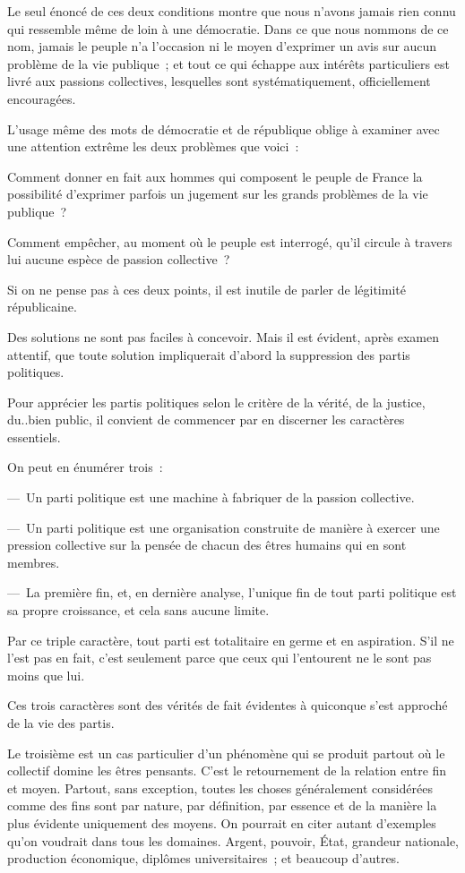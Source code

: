 \documentclass[french,twoside]{book} %
\begin{document}
Le seul énoncé de ces deux conditions montre que nous n’avons jamais rien connu qui ressemble même de loin à une démocratie. Dans ce que nous nommons de ce nom, jamais le peuple n’a l’occasion ni le moyen d’exprimer un avis sur aucun problème de la vie publique ; et tout ce qui échappe aux intérêts particuliers est livré aux passions collectives, lesquelles sont systématiquement, officiellement encouragées.\par
L’usage même des mots de démocratie et de république oblige à examiner avec une attention extrême les deux problèmes que voici :\par
Comment donner en fait aux hommes qui composent le peuple de France la possibilité d’exprimer parfois un jugement sur les grands problèmes de la vie publique ?\par
Comment empêcher, au moment où le peuple est interrogé, qu’il circule à travers lui aucune espèce de passion collective ?\par
Si on ne pense pas à ces deux points, il est inutile de parler de légitimité républicaine.\par
Des solutions ne sont pas faciles à concevoir. Mais il est évident, après examen attentif, que toute solution impliquerait d’abord la suppression des partis politiques.\par
Pour apprécier les partis politiques selon le critère de la vérité, de la justice, du..bien public, il convient de commencer par en discerner les caractères essentiels.\par
On peut en énumérer trois :\par
— Un parti politique est une machine à fabriquer de la passion collective.\par
— Un parti politique est une organisation construite de manière à exercer une pression collective sur la pensée de chacun des êtres humains qui en sont membres.\par
— La première fin, et, en dernière analyse, l’unique fin de tout parti politique est sa propre croissance, et cela sans aucune limite.\par
Par ce triple caractère, tout parti est totalitaire en germe et en aspiration. S’il ne l’est pas en fait, c’est seulement parce que ceux qui l’entourent ne le sont pas moins que lui.\par
Ces trois caractères sont des vérités de fait évidentes à quiconque s’est approché de la vie des partis.\par
Le troisième est un cas particulier d’un phénomène qui se produit partout où le collectif domine les êtres pensants. C’est le retournement de la relation entre fin et moyen. Partout, sans exception, toutes les choses généralement considérées comme des fins sont par nature, par définition, par essence et de la manière la plus évidente uniquement des moyens. On pourrait en citer autant d’exemples qu’on voudrait dans tous les domaines. Argent, pouvoir, État, grandeur nationale, production économique, diplômes universitaires ; et beaucoup d’autres.\par
\end{document}
